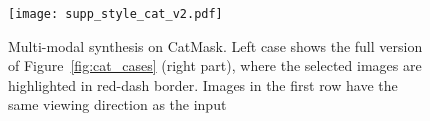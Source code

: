 \documentclass[runningheads]{llncs}
\begin{document}
\begin{figure}[t!]
    \centering
    \texttt{[image: supp\_style\_cat\_v2.pdf]}
    \vspace{-3mm}
    \caption{Multi-modal synthesis on CatMask. Left case shows the full version of Figure~\ref{fig:cat_cases} (right part), where the selected images are highlighted in red-dash border. Images in the first row have the same viewing direction as the input}
    \vspace{-3mm}
    \label{fig:supp_style_cat}
\end{figure}
\end{document}
